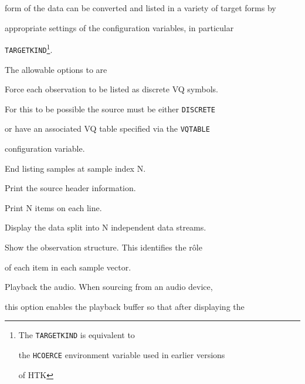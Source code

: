 form of the data can be converted and listed in a variety of target forms by


appropriate settings of the configuration variables, in particular


\texttt{TARGETKIND}\footnote{The \texttt{TARGETKIND} is equivalent to


the \texttt{HCOERCE} environment variable used in earlier versions


of HTK}.





The allowable options to  are





\begin{optlist}





   Force each observation to be listed as discrete VQ symbols.


    For this to be possible the source must be either \texttt{DISCRETE}


    or have an associated VQ table specified via the \texttt{VQTABLE}


    configuration variable.





    End listing samples at sample index N. 





    Print the source header information.





    Print N items on each line.





    Display the data split into N independent data streams.





    Show the observation structure.  This identifies the r\^{o}le


      of each item in each sample vector.





    Playback the audio.  When sourcing from an audio device,


     this option enables the playback buffer so that after displaying the



\end{optlist}
